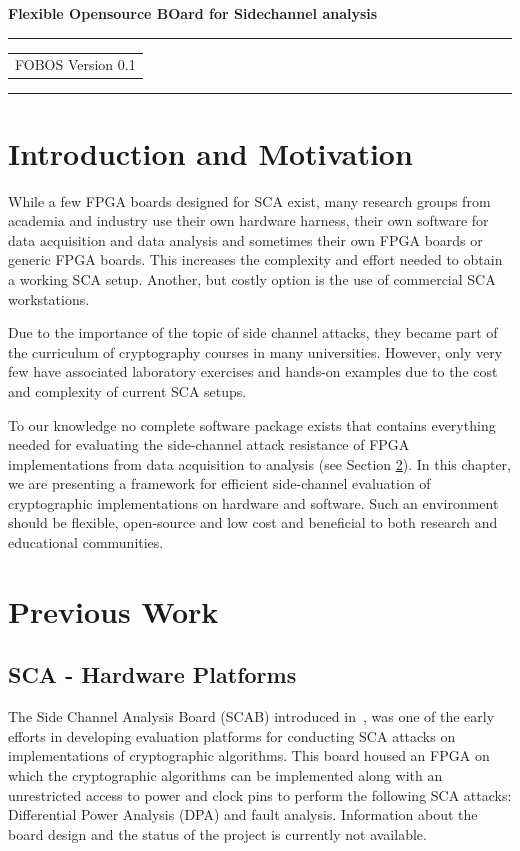 \documentclass{llncs}
\numberwithin{algorithm}{chapter}
\begin{document}
%
\begin{flushleft}
\LARGE\bfseries Flexible Opensource BOard for
Sidechannel analysis 
\end{flushleft}
\rule{\textwidth}{1pt}
\vspace{2pt}
\begin{flushright}
\Huge
\begin{tabular}{@{}l}
FOBOS
{\Large Version 0.1}
\end{tabular}
\end{flushright}
\rule{\textwidth}{1pt}
\vfill
%
\newpage
\tableofcontents
\newpage
\minitoc
\section{Introduction and Motivation}

While a few FPGA boards designed for SCA exist, many research groups from academia and
industry use their own hardware harness, their own software for data acquisition and data analysis
and sometimes their own FPGA boards or generic FPGA boards. This increases the complexity and
effort needed to obtain a working SCA setup. Another, but costly option is the use of
commercial SCA workstations.

Due to the importance of the topic of side channel attacks, they became part of 
the curriculum of cryptography courses in many universities. However, only very few have 
associated laboratory exercises and hands-on examples due to the cost and complexity
of current SCA setups. 

To our knowledge no complete software package exists that contains everything needed
for evaluating the side-channel attack resistance of FPGA implementations from 
data acquisition to analysis (see Section \ref{sec:previous}). In this chapter, we are presenting a 
framework
for efficient side-channel evaluation of cryptographic implementations on hardware and software. 
Such an environment should be flexible, open-source and low cost and beneficial to both
research and educational communities.


\section{Previous Work}\label{sec:previous}
\subsection{SCA - Hardware Platforms}\label{sec:SCAhw}
The Side Channel Analysis Board (SCAB) introduced in~\cite{2021}, was one of the early efforts in
developing evaluation platforms for conducting SCA attacks on implementations of cryptographic algorithms.
This board housed an FPGA on which the cryptographic algorithms can be implemented along with an unrestricted
access to power and clock pins to perform the following SCA attacks: 
Differential Power Analysis (DPA) and fault analysis. Information about the board design 
and the status of the project is currently not available.
\end{document}
